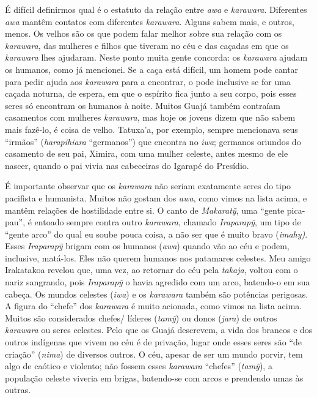 É difícil definirmos qual é o estatuto da relação entre \emph{awa} e
\emph{karawara}. Diferentes \emph{awa} mantêm contatos com diferentes
\emph{karawara}. Alguns sabem mais, e outros, menos. Os velhos são os
que podem falar melhor sobre sua relação com os \emph{karawara}, das
mulheres e filhos que tiveram no céu e das caçadas em que os
\emph{karawara} lhes ajudaram. Neste ponto muita gente concorda: os
\emph{karawara} ajudam os humanos, como já mencionei. Se a caça está
difícil, um homem pode cantar para pedir ajuda aos \emph{karawara} para
a encontrar, o pode inclusive se for uma caçada noturna, de espera, em
que o espírito fica junto a seu corpo, pois esses seres só encontram os
humanos à noite. Muitos Guajá também contraíam casamentos com mulheres
\emph{karawara}, mas hoje os jovens dizem que não sabem mais fazê-lo, é
coisa de velho. Tatuxa'a, por exemplo, sempre mencionava seus ``irmãos''
(\emph{harapihiara} ``germanos'') que encontra no \emph{iwa}; germanos
oriundos do casamento de seu pai, Ximira, com uma mulher celeste, antes
mesmo de ele nascer, quando o pai vivia nas cabeceiras do Igarapé do
Presídio.

É importante observar que os \emph{karawara} não seriam exatamente seres
do tipo pacifista e humanista. Muitos não gostam dos \emph{awa}, como
vimos na lista acima, e mantêm relações de hostilidade entre si. O canto
de \emph{Makaratỹ}, uma ``gente pica-pau'', é entoado sempre contra
outro \emph{karawara}, chamado \emph{Iraparapỹ}, um tipo de ``gente
arco'' do qual eu soube pouca coisa, a não ser que é muito bravo
(\emph{imahy)}. Esses \emph{Iraparapỹ} brigam com os humanos
(\emph{awa}) quando vão ao céu e podem, inclusive, matá-los. Eles não
querem humanos nos patamares celestes. Meu amigo Irakatakoa revelou que,
uma vez, ao retornar do céu pela \emph{takaja}, voltou com o nariz
sangrando, pois \emph{Iraparapỹ} o havia agredido com um arco, batendo-o
em sua cabeça. Os mundos celestes (\emph{iwa}) e os \emph{karawara}
também são potências perigosas. A figura do ``chefe'' dos
\emph{karawara} é muito acionada, como vimos na lista acima. Muitos são
considerados chefes/ líderes (\emph{tamỹ}) ou donos (\emph{jara}) de
outros \emph{karawara} ou seres celestes. Pelo que os Guajá descrevem, a
vida dos brancos e dos outros indígenas que vivem no céu é de privação,
lugar onde esses seres são ``de criação'' (\emph{nima}) de diversos
outros. O céu, apesar de ser um mundo porvir, tem algo de caótico e
violento; não fossem esses \emph{karawara} ``chefes'' (\emph{tamỹ}), a
população celeste viveria em brigas, batendo-se com arcos e prendendo
umas às outras.

